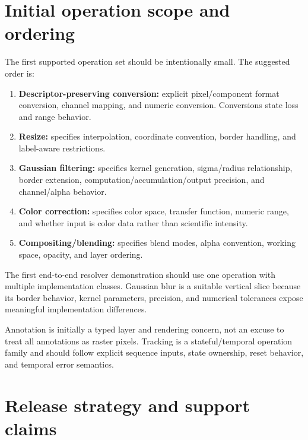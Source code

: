 \section{Initial operation scope and ordering}

The first supported operation set should be intentionally small. The suggested order is:
\begin{enumerate}
  \item \textbf{Descriptor-preserving conversion:} explicit pixel/component format conversion, channel mapping, and numeric conversion. Conversions state loss and range behavior.
  \item \textbf{Resize:} specifies interpolation, coordinate convention, border handling, and label-aware restrictions.
  \item \textbf{Gaussian filtering:} specifies kernel generation, sigma/radius relationship, border extension, computation/accumulation/output precision, and channel/alpha behavior.
  \item \textbf{Color correction:} specifies color space, transfer function, numeric range, and whether input is color data rather than scientific intensity.
  \item \textbf{Compositing/blending:} specifies blend modes, alpha convention, working space, opacity, and layer ordering.
\end{enumerate}

The first end-to-end resolver demonstration should use one operation with multiple implementation classes. Gaussian blur is a suitable vertical slice because its border behavior, kernel parameters, precision, and numerical tolerances expose meaningful implementation differences.

Annotation is initially a typed layer and rendering concern, not an excuse to treat all annotations as raster pixels. Tracking is a stateful/temporal operation family and should follow explicit sequence inputs, state ownership, reset behavior, and temporal error semantics.

\section{Release strategy and support claims}

